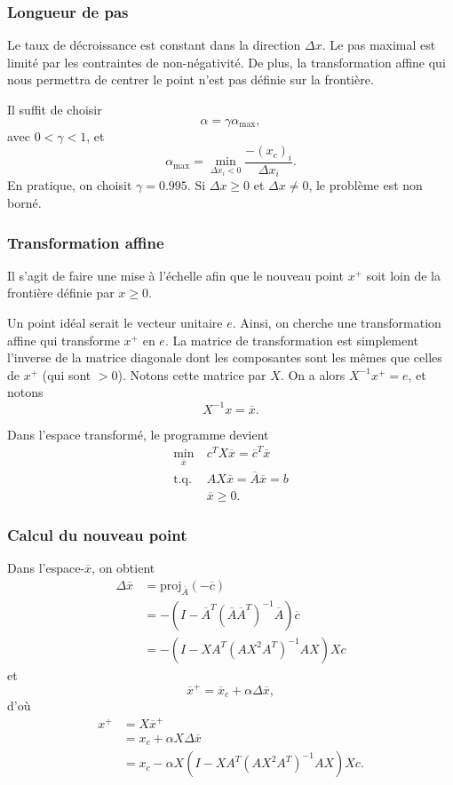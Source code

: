 \documentclass[t,usepdftitle=false]{beamer}
\begin{document}
\begin{frame}
	\frametitle{Longueur de pas}
	
	Le taux de décroissance est constant dans la direction $\Delta x$.
	Le pas maximal est limité par les contraintes de non-négativité.
	De plus, la transformation affine qui nous permettra de centrer le point n'est pas définie sur la frontière.
	
	\mbox{}
	
	Il suffit de choisir
	$$
	\alpha = \gamma\alpha_{\max},
	$$
	avec $0 < \gamma < 1$, et
	$$
	\alpha_{\max} = \min_{\Delta x_i < 0} \frac{-(x_c)_i}{\Delta x_i}.
	$$
	En pratique, on choisit $\gamma  = 0.995$.
	Si $\Delta x \geq 0$ et $\Delta x \ne 0$, le problème est non borné.
	
\end{frame}

\begin{frame}
	\frametitle{Transformation affine}
	
	Il s'agit de faire une mise à l'échelle afin que le nouveau point $x^+$ soit loin de la frontière définie par $x \geq 0$.
	
	\mbox{}
	
	Un point idéal serait le vecteur unitaire $e$. Ainsi, on cherche une transformation
	affine qui transforme $x^+$ en $e$.
	La matrice de transformation est simplement l'inverse de la matrice diagonale dont les
	composantes sont les mêmes que celles de $x^+$ (qui sont $>0$).
	Notons cette matrice par $X$.
	On a alors $X^{-1}x^+ = e$, et notons
	$$
	X^{-1}x = \overline{x}.
	$$
	
	\mbox{}
	
	Dans l'espace transformé, le programme devient
	\begin{align*}
		\min_{\overline{x}} \ & c^TX\overline{x} = \overline{c}^T\overline{x} \\
		\mbox{t.q. } & AX\overline{x} = \overline{A}\overline{x} = b\\
		& \overline{x} \geq 0.
	\end{align*}
	
\end{frame}

\begin{frame}
	\frametitle{Calcul du nouveau point}
	
	Dans l'espace-$\overline{x}$, on obtient %
	\begin{align*}
		\Delta\overline{x} &= \text{proj}_{\overline{A}}(-\overline{c}) \\
		& = -(I - \overline{A}^T(\overline{A}\overline{A}^T)^{-1}\overline{A})\overline{c} \\
		& = -(I - XA^T(AX^2A^T)^{-1}AX)Xc
	\end{align*}
	et
	$$
	\overline{x}^+ = \overline{x}_c + \alpha \Delta \overline{x},
	$$
	d'où
	\begin{align*}
		x^+ &= X\overline{x}^+ \\
		&= x_c + \alpha X \Delta \overline{x} \\
		&= x_c - \alpha X(I - XA^T(AX^2A^T)^{-1}AX)Xc.
	\end{align*}
	
\end{frame}
\end{document}
